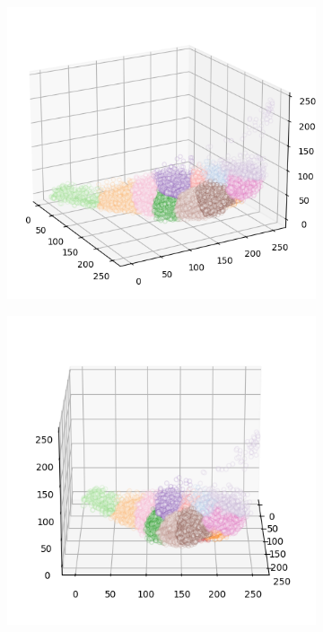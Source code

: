 \begin{figure}[htbp]
    \begin{subfigure}[t]{0.32\textwidth}
        \includegraphics[width=\linewidth]{../../python_code/plots/kmeans/horse-170/clusters_elev20_azim-30.png}
    \end{subfigure}
    \begin{subfigure}[t]{0.32\textwidth}
        \includegraphics[width=\linewidth]{../../python_code/plots/kmeans/horse-170/clusters_elev20_azim0.png}

\end{subfigure}
\end{figure}
